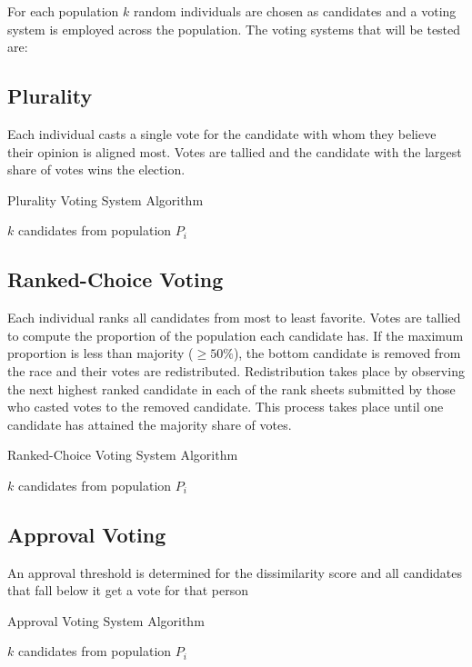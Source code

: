
For each population $k$ random individuals are chosen as candidates and a voting system is employed across the population.
The voting systems that will be tested are:
\subsection{Plurality}
Each individual casts a single vote for the candidate with whom they believe their opinion is aligned most.
Votes are tallied and the candidate with the largest share of votes wins the election.
\begin{algorithm}[H]
\caption{Plurality Voting System Algorithm}\label{alg:plurality}
\begin{algorithmic}
\State \Choose $k$ candidates from population $P_i$
\end{algorithmic}
\end{algorithm}

\subsection{Ranked-Choice Voting}
Each individual ranks all candidates from most to least favorite.
Votes are tallied to compute the proportion of the population each candidate has.
If the maximum proportion is less than majority ($\geq 50\%$), the bottom candidate is removed from the race and their votes are redistributed.
Redistribution takes place by observing the next highest ranked candidate in each of the rank sheets submitted by those who casted votes
to the removed candidate. This process takes place until one candidate has attained the majority share of votes.
\begin{algorithm}[H]
\caption{Ranked-Choice Voting System Algorithm}\label{alg:ranked}
\begin{algorithmic}
\State \Choose $k$ candidates from population $P_i$
\end{algorithmic}
\end{algorithm}

\subsection{Approval Voting}
An approval threshold is determined for the dissimilarity score and all candidates that fall below it get a vote for that person
\begin{algorithm}[H]
\caption{Approval Voting System Algorithm}\label{alg:approval}
\begin{algorithmic}
\State \Choose $k$ candidates from population $P_i$
\end{algorithmic}
\end{algorithm}
